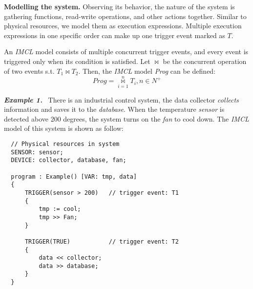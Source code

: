 \medskip
\textbf{Modelling the system. }
Observing its behavior, the nature of the system is gathering functions, read-write operations, and other actions together. Similar to physical resources, we model them as execution expressions. Multiple execution expressions in one specific order can make up one trigger event marked as $T$.

An \emph{IMCL} model consists of multiple concurrent trigger events, and every event is triggered only when its condition is satisfied. Let $\bowtie$ be the concurrent operation of two events s.t. $T_1\bowtie T_2$. Then, the \emph{IMCL} model \emph{Prog} can be defined:
\begin{displaymath}
Prog = \overset{n}{\underset{i=1}{\bowtie}} T_{i}, n \in N^{+}
\end{displaymath}


\textbf{\emph{Example 1.}} \ There is an industrial control system, the data collector \emph{collects} information and saves it to the \emph{database}. When the temperature \emph{sensor} is detected above 200 degrees, the system turns on the \emph{fan} to cool down. The \emph{IMCL} model of this system is shown as follow:

{}
\begin{lstlisting}
  // Physical resources in system
  SENSOR: sensor;
  DEVICE: collector, database, fan;

  program : Example() [VAR: tmp, data]
  {
      TRIGGER(sensor > 200)   // trigger event: T1
      {
          tmp := cool;
          tmp >> Fan;
      }

      TRIGGER(TRUE)           // trigger event: T2
      {
          data << collector;
          data >> database;
      }
  }
\end{lstlisting}


